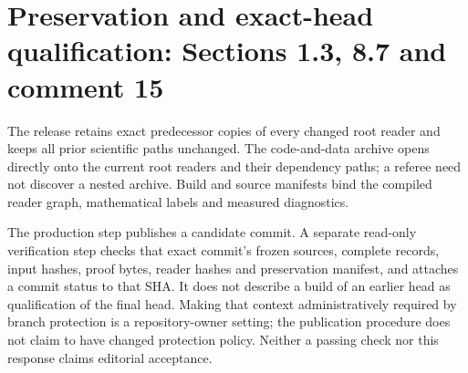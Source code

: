 \section{Preservation and exact-head qualification: Sections 1.3, 8.7 and comment 15}
The release retains exact predecessor copies of every changed root reader and keeps all prior scientific paths unchanged. The code-and-data archive opens directly onto the current root readers and their dependency paths; a referee need not discover a nested archive. Build and source manifests bind the compiled reader graph, mathematical labels and measured diagnostics.

The production step publishes a candidate commit. A separate read-only verification step checks that exact commit's frozen sources, complete records, input hashes, proof bytes, reader hashes and preservation manifest, and attaches a commit status to that SHA. It does not describe a build of an earlier head as qualification of the final head. Making that context administratively required by branch protection is a repository-owner setting; the publication procedure does not claim to have changed protection policy. Neither a passing check nor this response claims editorial acceptance.
